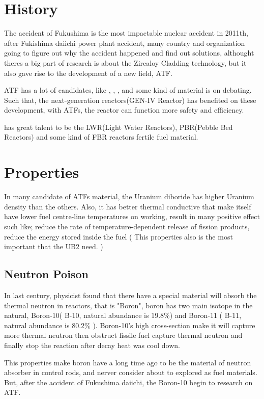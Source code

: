 \documentclass[final,10pt,times,twocolumn]{elsarticle}
\begin{document}
\section{History}
The accident of Fukushima is the most impactable nuclear accident in 2011th, after Fukishima daiichi power plant accident, many country and organization going to figure out why the accident happened and find out solutions, althought theres a big part of research is about the Zircaloy Cladding technology, but it also gave rise to the development of a new field, ATF.

ATF has a lot of candidates, like , , ,  and some kind of material is on debating. Such that, the next-generation reactors(GEN-IV Reactor) has benefited on these development, with ATFs, the reactor can function more safety and efficiency.

 has great talent to be the LWR(Light Water Reactors), PBR(Pebble Bed Reactors) and some kind of FBR reactors fertile fuel material.

\section{Properties}
In many candidate of ATFs material, the Uranium diboride has higher Uranium density than the others. Also, it has better thermal conductive that make itself have lower fuel centre-line temperatures on working, result in many positive effect such like; reduce the rate of temperature-dependent release of fission products, reduce the energy stored inside the fuel ( This properties also is the most important that the UB2 need. )

\subsection{Neutron Poison}
In last century, physicist found that there have a special material will absorb the thermal neutron in reactors, that is "Boron", boron has two main isotope in the natural, Boron-10( B-10, natural abundance is $19.8\%$) and Boron-11 ( B-11, natural abundance is $80.2\%$ ). Boron-10's high cross-section make it will capture more thermal neutron then obstruct fissile fuel capture thermal neutron and finally stop the reaction after decay heat was cool down.

This properties make boron have a long time ago to be the material of neutron absorber in control rods, and nerver consider about to explored as fuel materials. But, after the accident of Fukushima daiichi, the Boron-10 begin to research on ATF.
\end{document}
